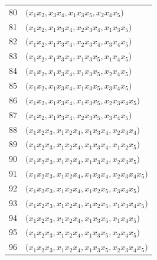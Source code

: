 {\begin{longtable}{@{}r>{\raggedright\arraybackslash}p{}@{}}
80 & \(\bigl(x_{1}x_{2},\allowbreak x_{3}x_{4},\allowbreak x_{1}x_{3}x_{5},\allowbreak x_{2}x_{4}x_{5}\bigr)\) \\
81 & \(\bigl(x_{1}x_{2},\allowbreak x_{1}x_{3}x_{4},\allowbreak x_{2}x_{3}x_{4},\allowbreak x_{1}x_{3}x_{5}\bigr)\) \\
82 & \(\bigl(x_{1}x_{2},\allowbreak x_{1}x_{3}x_{4},\allowbreak x_{2}x_{3}x_{4},\allowbreak x_{3}x_{4}x_{5}\bigr)\) \\
83 & \(\bigl(x_{1}x_{2},\allowbreak x_{1}x_{3}x_{4},\allowbreak x_{1}x_{3}x_{5},\allowbreak x_{1}x_{4}x_{5}\bigr)\) \\
84 & \(\bigl(x_{1}x_{2},\allowbreak x_{1}x_{3}x_{4},\allowbreak x_{1}x_{3}x_{5},\allowbreak x_{2}x_{4}x_{5}\bigr)\) \\
85 & \(\bigl(x_{1}x_{2},\allowbreak x_{1}x_{3}x_{4},\allowbreak x_{1}x_{3}x_{5},\allowbreak x_{3}x_{4}x_{5}\bigr)\) \\
86 & \(\bigl(x_{1}x_{2},\allowbreak x_{1}x_{3}x_{4},\allowbreak x_{1}x_{3}x_{5},\allowbreak x_{2}x_{3}x_{4}x_{5}\bigr)\) \\
87 & \(\bigl(x_{1}x_{2},\allowbreak x_{1}x_{3}x_{4},\allowbreak x_{2}x_{3}x_{5},\allowbreak x_{3}x_{4}x_{5}\bigr)\) \\
88 & \(\bigl(x_{1}x_{2}x_{3},\allowbreak x_{1}x_{2}x_{4},\allowbreak x_{1}x_{3}x_{4},\allowbreak x_{2}x_{3}x_{4}\bigr)\) \\
89 & \(\bigl(x_{1}x_{2}x_{3},\allowbreak x_{1}x_{2}x_{4},\allowbreak x_{1}x_{3}x_{4},\allowbreak x_{1}x_{2}x_{5}\bigr)\) \\
90 & \(\bigl(x_{1}x_{2}x_{3},\allowbreak x_{1}x_{2}x_{4},\allowbreak x_{1}x_{3}x_{4},\allowbreak x_{2}x_{3}x_{5}\bigr)\) \\
91 & \(\bigl(x_{1}x_{2}x_{3},\allowbreak x_{1}x_{2}x_{4},\allowbreak x_{1}x_{3}x_{4},\allowbreak x_{2}x_{3}x_{4}x_{5}\bigr)\) \\
92 & \(\bigl(x_{1}x_{2}x_{3},\allowbreak x_{1}x_{2}x_{4},\allowbreak x_{1}x_{2}x_{5},\allowbreak x_{3}x_{4}x_{5}\bigr)\) \\
93 & \(\bigl(x_{1}x_{2}x_{3},\allowbreak x_{1}x_{2}x_{4},\allowbreak x_{1}x_{2}x_{5},\allowbreak x_{1}x_{3}x_{4}x_{5}\bigr)\) \\
94 & \(\bigl(x_{1}x_{2}x_{3},\allowbreak x_{1}x_{2}x_{4},\allowbreak x_{1}x_{3}x_{5},\allowbreak x_{1}x_{4}x_{5}\bigr)\) \\
95 & \(\bigl(x_{1}x_{2}x_{3},\allowbreak x_{1}x_{2}x_{4},\allowbreak x_{1}x_{3}x_{5},\allowbreak x_{2}x_{4}x_{5}\bigr)\) \\
96 & \(\bigl(x_{1}x_{2}x_{3},\allowbreak x_{1}x_{2}x_{4},\allowbreak x_{1}x_{3}x_{5},\allowbreak x_{2}x_{3}x_{4}x_{5}\bigr)\) \\

\end{longtable}}
